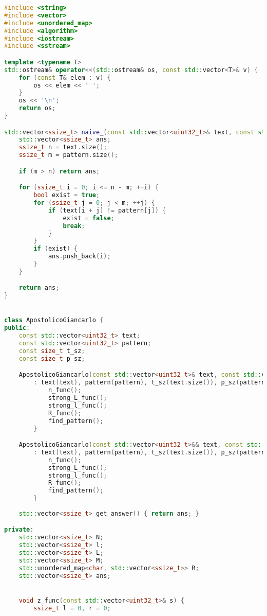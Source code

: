 \begin{lstlisting}[language=C++]
#include <string>
#include <vector>
#include <unordered_map>
#include <algorithm>
#include <iostream>
#include <sstream>

template <typename T>
std::ostream& operator<<(std::ostream& os, const std::vector<T>& v) {
    for (const T& elem : v) {
        os << elem << ' ';
    }
    os << '\n';
    return os;
}

std::vector<ssize_t> naive_(const std::vector<uint32_t>& text, const std::vector<uint32_t>& pattern) {
    std::vector<ssize_t> ans;
    ssize_t n = text.size();
    ssize_t m = pattern.size();

    if (m > n) return ans;

    for (ssize_t i = 0; i <= n - m; ++i) {
        bool exist = true;
        for (ssize_t j = 0; j < m; ++j) {
            if (text[i + j] != pattern[j]) {
                exist = false;
                break;
            }
        }
        if (exist) {
            ans.push_back(i);
        }
    }

    return ans;
}


class ApostolicoGiancarlo {
public:
    const std::vector<uint32_t> text;
    const std::vector<uint32_t> pattern;
    const size_t t_sz;
    const size_t p_sz;

    ApostolicoGiancarlo(const std::vector<uint32_t>& text, const std::vector<uint32_t>& pattern)
        : text(text), pattern(pattern), t_sz(text.size()), p_sz(pattern.size()), N(p_sz, 0), l(p_sz, 0), L(p_sz, -1), M(t_sz, 0) {
            n_func();
            strong_L_func();
            strong_l_func();
            R_func();
            find_pattern();
        }

    ApostolicoGiancarlo(const std::vector<uint32_t>&& text, const std::vector<uint32_t>&& pattern)
        : text(text), pattern(pattern), t_sz(text.size()), p_sz(pattern.size()), N(p_sz, 0), l(p_sz, 0), L(p_sz, -1), M(t_sz, 0) {
            n_func();
            strong_L_func();
            strong_l_func();
            R_func();
            find_pattern();
        }
    
    std::vector<ssize_t> get_answer() { return ans; }

private:
    std::vector<ssize_t> N;
    std::vector<ssize_t> l;
    std::vector<ssize_t> L;
    std::vector<ssize_t> M;
    std::unordered_map<char, std::vector<ssize_t>> R;
    std::vector<ssize_t> ans;


    void z_func(const std::vector<uint32_t>& s) {
        ssize_t l = 0, r = 0;


\end{lstlisting}
